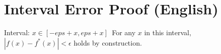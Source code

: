 \section*{Interval Error Proof (English)}
Interval: $x \in \left[- eps + x, eps + x\right]$\
For any $x$ in this interval, $|f(x)-f^*(x)|<\epsilon$ holds by construction.\
